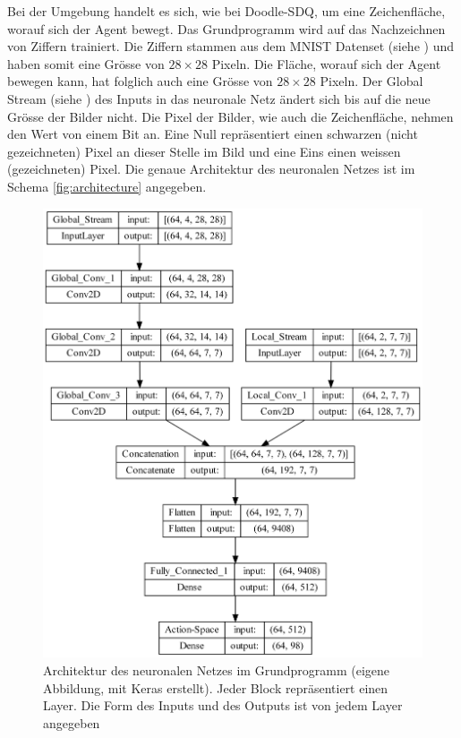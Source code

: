 Bei der Umgebung handelt es sich, wie bei Doodle-SDQ, um eine Zeichenfläche,
worauf sich der Agent bewegt. Das Grundprogramm wird auf das
Nachzeichnen von Ziffern trainiert. Die Ziffern stammen aus dem MNIST Datenset
(siehe ) und haben somit eine Grösse von $28\times28$
Pixeln. Die Fläche, worauf sich der Agent bewegen  
kann, hat folglich auch eine Grösse von $28\times28$ Pixeln. Der Global Stream
(siehe ) des Inputs in das neuronale Netz ändert sich
bis auf die neue Grösse der Bilder nicht. Die Pixel der Bilder, wie auch die
Zeichenfläche, nehmen den Wert von einem Bit an. Eine Null repräsentiert einen
schwarzen (nicht gezeichneten) Pixel an dieser Stelle im Bild und eine Eins
einen weissen (gezeichneten) Pixel. Die genaue Architektur des neuronalen Netzes
ist im Schema \autoref{fig:architecture} angegeben.
 
\begin{figure}[!ht]
 \centering
 \includegraphics[width=\textwidth-4cm]{images/methode/architecture.png}
 \caption{Architektur des neuronalen Netzes im Grundprogramm (eigene Abbildung, mit Keras erstellt). Jeder Block repräsentiert einen Layer. Die Form des Inputs und des Outputs ist von jedem Layer angegeben}\label{fig:architecture}
\end{figure}
 
